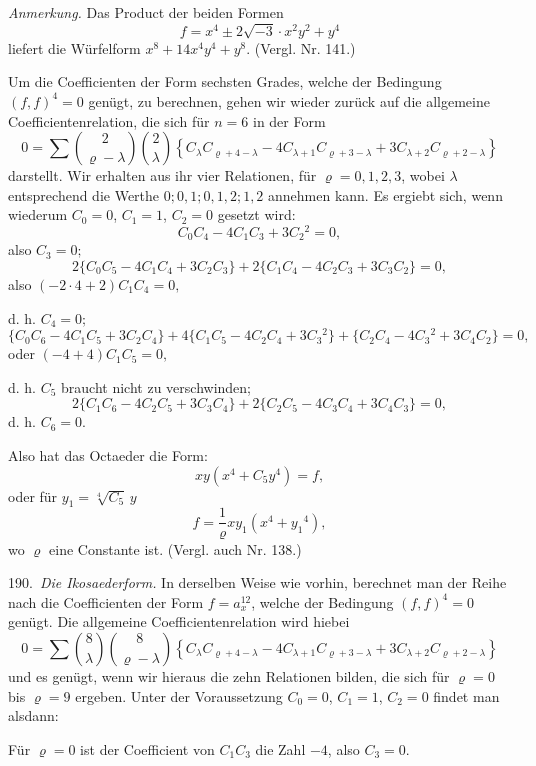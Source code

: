 \documentclass[11pt]{article}
\providecommand{\weberpage}[1]{}
\providecommand{\weq}[2]{\begin{equation}\tag{#1}#2\end{equation}}
\begin{document}
\textit{Anmerkung.} Das Product der beiden Formen
\[
f=x^4\pm 2\sqrt{-3}\cdot x^2y^2+y^4
\]
liefert die Würfelform $x^8+14x^4y^4+y^8$. (Vergl. Nr. 141.)

Um die Coefficienten der Form sechsten Grades, welche der Bedingung
 $(f,f)^4=0$ genügt, zu berechnen, gehen wir wieder zurück auf
die allgemeine Coefficientenrelation, die sich für $n=6$ in der Form
\[
0=\sum\binom{2}{\varrho-\lambda}\binom{2}{\lambda}\left\{C_\lambda C_{\varrho+4-\lambda}-4C_{\lambda+1}C_{\varrho+3-\lambda}+3C_{\lambda+2}C_{\varrho+2-\lambda}\right\}
\]
darstellt. Wir erhalten aus ihr vier Relationen, für $\varrho=0,1,2,3$,
wobei $\lambda$ entsprechend die Werthe $0; 0,1; 0,1,2; 1,2$ annehmen
kann. Es ergiebt sich, wenn wiederum $C_0=0$, $C_1=1$, $C_2=0$ gesetzt
 wird:
\weq{1}{C_0C_4-4C_1C_3+3C_2{}^2=0,}
also $C_3=0;$
\weq{2}{2\{C_0C_5-4C_1C_4+3C_2C_3\}+2\{C_1C_4-4C_2C_3+3C_3C_2\}=0,}
also $(-2\cdot4+2)C_1C_4=0,$

d. h. $C_4=0;$
\weq{3}{\{C_0C_6-4C_1C_5+3C_2C_4\}+4\{C_1C_5-4C_2C_4+3C_3{}^2\}+\{C_2C_4-4C_3{}^2+3C_4C_2\}=0,}
oder $(-4+4)C_1C_5=0,$

d. h. $C_5$ braucht nicht zu verschwinden;
\weq{4}{2\{C_1C_6-4C_2C_5+3C_3C_4\}+2\{C_2C_5-4C_3C_4+3C_4C_3\}=0,}
d. h. $C_6=0.$


\weberpage{212}
Also hat das Octaeder die Form:
\[
xy(x^4+C_5y^4)=f,
\]
oder für $y_1=\sqrt[4]{C_5}\,y$
\[
f=\frac{1}{\varrho}xy_1(x^4+y_1{}^4),
\]
wo $\varrho$ eine Constante ist. (Vergl. auch Nr. 138.)

190.\ \textit{Die Ikosaederform.} In derselben Weise wie vorhin, berechnet
 man der Reihe nach die Coefficienten der Form $f=a_x^{12}$, welche
der Bedingung $(f,f)^4=0$ genügt. Die allgemeine Coefficientenrelation
 wird hiebei
\[
0=\sum\binom{8}{\lambda}\binom{8}{\varrho-\lambda}\left\{C_\lambda C_{\varrho+4-\lambda}-4C_{\lambda+1}C_{\varrho+3-\lambda}+3C_{\lambda+2}C_{\varrho+2-\lambda}\right\}
\]
und es genügt, wenn wir hieraus die zehn Relationen bilden, die sich
für $\varrho=0$ bis $\varrho=9$ ergeben. Unter der Voraussetzung $C_0=0$,
$C_1=1$, $C_2=0$ findet man alsdann:

Für $\varrho=0$ ist der Coefficient von $C_1C_3$ die Zahl $-4$, also $C_3=0$.
\end{document}
